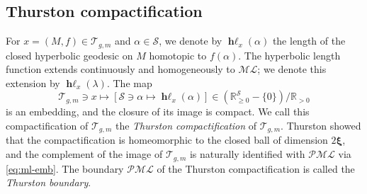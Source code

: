 \documentclass[dvipdfmx]{amsart}
\theoremstyle{remark}
\newcommand{\teich}{\mathcal{T}}
\newcommand{\tmod}{\operatorname{Mod}}
\newcommand{\convgenus}{{\boldsymbol \xi}}
\newcommand{\ml}{\mathcal{ML}}
\newcommand{\pml}{\mathcal{PML}}
\newcommand{\hypell}{\operatorname{\mathbf{h\ell}}}
\begin{document}
\subsection{Thurston compactification}
For $x=(M,f)\in \teich_{g,m}$ and $\alpha\in \mathcal{S}$, we denote by $\hypell_x(\alpha)$ the length of the closed hyperbolic geodesic on $M$ homotopic to $f(\alpha)$.
The hyperbolic length function extends continuously and homogeneously to $\ml$; we denote this extension by $\hypell_x(\lambda)$.
The map 
\[
\teich_{g,m}\ni x\mapsto [\mathcal{S}\ni \alpha\mapsto \hypell_x(\alpha)]\in (\mathbb{R}^{\mathcal{S}}_{\ge 0}-\{0\})/\mathbb{R}_{>0}
\]
is an embedding, and the closure of its image is compact.
We call this compactification of $\teich_{g,m}$ the \emph{Thurston compactification} of $\teich_{g,m}$.
Thurston showed that the compactification is homeomorphic to the closed ball of dimension $2\convgenus$, and the complement of the image of $\teich_{g,m}$ is naturally identified with $\pml$ via \eqref{eq:ml-emb}. 
The boundary $\pml$ of the Thurston compactification is called the \emph{Thurston boundary}.


\end{document}
